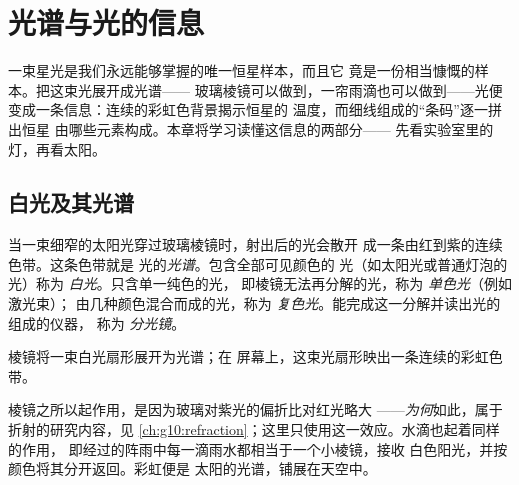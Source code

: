 \chapter{光谱与光的信息}\label{ch:g10:light-spectra}

一束星光是我们永远能够掌握的唯一恒星样本，而且它
竟是一份相当慷慨的样本。把这束光展开成光谱——
玻璃棱镜可以做到，一帘雨滴也可以做到——光便
变成一条信息：连续的彩虹色背景揭示恒星的
温度，而细线组成的“条码”逐一拼出恒星
由哪些元素构成。本章将学习读懂这信息的两部分——
先看实验室里的灯，再看太阳。

\section{白光及其光谱}

\begin{definition}[白光的分解]\label{def:g10:light-spectra:white}
当一束细窄的太阳光穿过玻璃棱镜时，射出后的光会散开
成一条由红到紫的连续色带。这条色带就是
光的\emph{光谱}。包含全部可见颜色的
光（如太阳光或普通灯泡的光）称为
\emph{白光}。只含单一纯色的光，
即棱镜无法再分解的光，称为
\emph{单色光}（例如激光束）；
由几种颜色混合而成的光，称为
\emph{复色光}。能完成这一分解并读出光的组成的仪器，
称为
\emph{分光镜}。
\end{definition}

\begin{omfigure}

{\small 棱镜将一束白光扇形展开为光谱；在
屏幕上，这束光扇形映出一条连续的彩虹色带。}
\end{omfigure}

\begin{remark}[棱镜与雨滴]\label{rem:g10:light-spectra:rainbow}
棱镜之所以起作用，是因为玻璃对紫光的偏折比对红光略大
——\emph{为何}如此，属于折射的研究内容，见
\cref{ch:g10:refraction}；这里只使用这一效应。水滴也起着同样的作用，
即经过的阵雨中每一滴雨水都相当于一个小棱镜，接收
白色阳光，并按颜色将其分开返回。彩虹便是
太阳的光谱，铺展在天空中。
\end{remark}

